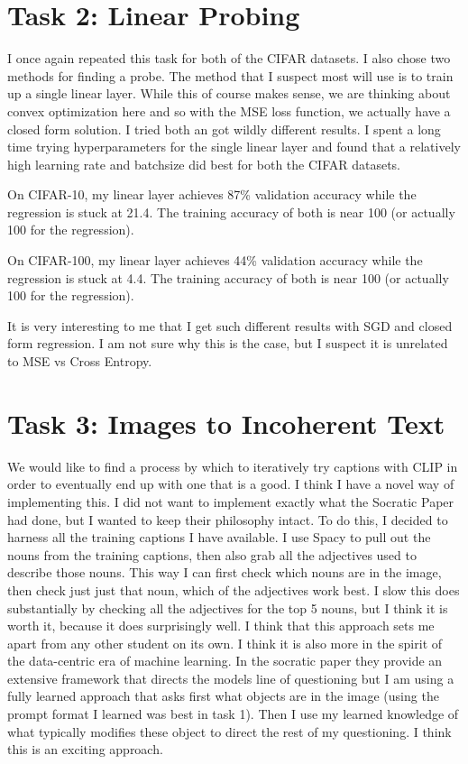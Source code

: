 \documentclass{article}
\begin{document}
\section*{Task 2: Linear Probing}

I once again repeated this task for both of the CIFAR datasets. I also chose two methods for finding a probe. The method that I suspect most will use is to train up a single linear layer. While this of course makes sense, we are thinking about convex optimization here and so with the MSE loss function, we actually have a closed form solution. I tried both an got wildly different results. I spent a long time trying hyperparameters for the single linear layer and found that a relatively high learning rate and batchsize did best for both the CIFAR datasets. 

On CIFAR-10, my linear layer achieves 87\% validation accuracy while the regression is stuck at 21.4. The training accuracy of both is near 100 (or actually 100 for the regression).

On CIFAR-100, my linear layer achieves 44\% validation accuracy while the regression is stuck at 4.4. The training accuracy of both is near 100 (or actually 100 for the regression).


It is very interesting to me that I get such different results with SGD and closed form regression. I am not sure why this is the case, but I suspect it is unrelated to MSE vs Cross Entropy. 

\section*{Task 3: Images to Incoherent Text}
We would like to find a process by which to iteratively try captions with CLIP in order to eventually end up with one that is a good. I think I have a novel way of implementing this. I did not want to implement exactly what the Socratic Paper had done, but I wanted to keep their philosophy intact. To do this, I decided to harness all the training captions I have available. I use Spacy to pull out the nouns from the training captions, then also grab all the adjectives used to describe those nouns. This way I can first check which nouns are in the image, then check just just that noun, which of the adjectives work best. I slow this does substantially by checking all the adjectives for the top 5 nouns, but I think it is worth it, because it does surprisingly well. I think that this approach sets me apart from any other student on its own. I think it is also more in the spirit of the data-centric era of machine learning. In the socratic paper they provide an extensive framework that directs the models line of questioning but I am using a fully learned approach that asks first what objects are in the image (using the prompt format I learned was best in task 1). Then I use my learned knowledge of what typically modifies these object to direct the rest of my questioning. I think this is an exciting approach.
\end{document}
